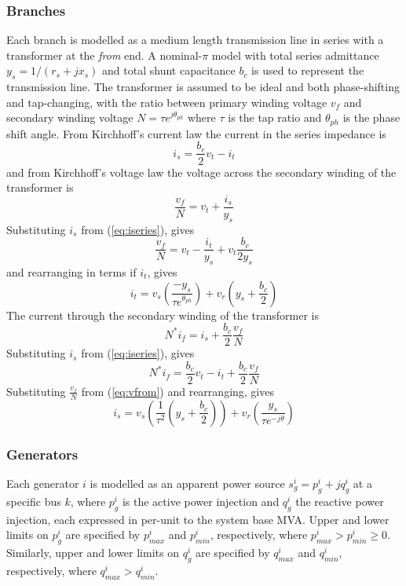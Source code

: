 \subsubsection{Branches}
Each branch is modelled as a medium length transmission line in series with a
transformer at the \textit{from} end.  A nominal-$\pi$ model with total series
admittance $y_s = 1/(r_s+jx_s)$ and total shunt capacitance $b_c$ is
used to represent the transmission line.  The transformer is assumed to be
ideal and both phase-shifting and tap-changing, with the ratio between primary
winding voltage $v_{f}$ and secondary winding voltage $N = \tau
e^{j\theta_{ph}}$ where $\tau$ is the tap ratio and $\theta_{ph}$ is the phase
shift angle.  From Kirchhoff's current law the current in the series impedance
is
\begin{equation}
\label{eq:iseries}
i_s = \frac{b_c}{2}v_t - i_t
\end{equation}
and from Kirchhoff's voltage law the voltage across the secondary winding of
the transformer is
\begin{equation}
\frac{v_{f}}{N} = v_t + \frac{i_s}{y_s}
\end{equation}
Substituting $i_s$ from (\ref{eq:iseries}), gives
\begin{equation}
\label{eq:vfrom}
\frac{v_{f}}{N} = v_t - \frac{i_t}{y_s} + v_t\frac{b_c}{2y_s}
\end{equation}
and rearranging in terms if $i_t$, gives
\begin{equation}
\label{eq:ito}
i_t = v_s \left( \frac{-y_s}{\tau e^{\theta_{ph}}} \right) +
v_r \left( y_s + \frac{b_c}{2} \right)
\end{equation}
The current through the secondary winding of the transformer is
\begin{equation}
N^*i_f = i_s + \frac{b_c}{2}\frac{v_{f}}{N}
\end{equation}
Substituting $i_s$ from (\ref{eq:iseries}), gives
\begin{equation}
N^*i_f = \frac{b_c}{2}v_t - i_t + \frac{b_c}{2}\frac{v_{f}}{N}
\end{equation}
Substituting $\frac{v_{f}}{N}$ from (\ref{eq:vfrom}) and rearranging, gives
\begin{equation}
\label{eq:ifrom}
i_s = v_s \left( \frac{1}{\tau^2} \left(y_s + \frac{b_c}{2}\right) \right) +
v_r \left(\frac{y_s}{\tau e^{-j\theta}}\right)
\end{equation}

\subsubsection{Generators}
\label{sec:generators}
Each generator $i$ is modelled as an apparent power source $s^i_g = p^i_g +
jq^i_g$ at a specific bus $k$, where $p^i_g$ is the active power injection and
$q^i_g$ the reactive power injection, each expressed in per-unit to the system
base MVA. Upper and lower limits on $p^i_g$ are specified by $p^i_{max}$ and
$p^i_{min}$, respectively, where $p^i_{max} > p^i_{min} \geq 0$.  Similarly,
upper and lower limits on $q^i_g$ are specified by $q_{max}^i$ and
$q_{min}^i$, respectively, where $q^i_{max} > q^i_{min}$.

